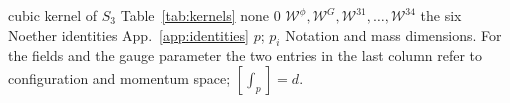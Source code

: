 \documentclass[prd,aps,preprint,superscriptaddress,nofootinbib,amsmath,amssymb,eqsecnum]{revtex4-2}
\newcommand{\W}{\mathcal{W}}
\newcommand{\ip}[1]{\int_{#1}}
\providecommand{\DIFdeltex}[1]{{\protect\color{red} \scriptsize #1}} %
\providecommand{\DIFdelFL}[1]{\DIFdel{#1}} %
\providecommand{\DIFdel}[1]{\texorpdfstring{\DIFdeltex{#1}}{}} %
\begin{document}
\DIFdelFL{cubic kernel of $S_3$ }%
\DIFdelFL{Table~\ref{tab:kernels} }%
\DIFdelFL{none }%
\DIFdelFL{$0$ }%
\DIFdelFL{$\W^{\phi},\W^{G},\W^{31},\dots,\W^{34}$ }%
\DIFdelFL{the six Noether identities }%
\DIFdelFL{App.~\ref{app:identities} }%
\DIFdelFL{$p$; $p_i$ }%
{%
\DIFdelFL{Notation and mass dimensions. For the fields and the gauge parameter the two entries
in the last column refer to configuration and momentum space; $[\ip{p}]=d$.}}
\end{document}
